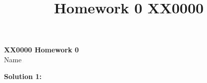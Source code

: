 \documentclass[11pt]{article}
\begin{document}
\title{Homework 0 XX0000}

\thispagestyle{empty}

\begin{center}
{\LARGE \bf XX0000 Homework 0}\\
{\large Name}\\
\end{center}

\textbf{Solution 1:}\\
\end{document}
